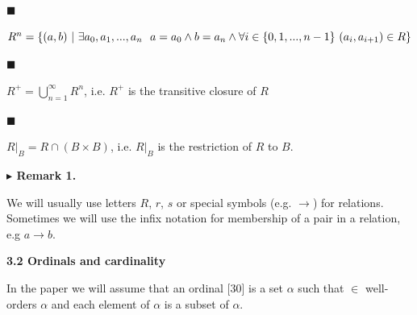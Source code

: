 \documentclass[10pt,a4paper]{amsart}
\begin{document}
 
 
\par\noindent  $\blacksquare$ 
 
$R^{n}=\{(a,b)\leavevmode\nobreak\ |\leavevmode\nobreak\ \exists a_{0},a_{1},..%
.,a_{n}\leavevmode\nobreak\ \leavevmode\nobreak\ a=a_{0}\wedge b=a_{n}\wedge%
\forall i\in\{0,1,...,n-1\}\leavevmode\nobreak\ (a_{i},a_{i+1})\in R\}$\par
 
 
 
\par\noindent  $\blacksquare$ 
 
$R^{+}=\bigcup_{n=1}^{\infty}R^{n}$, i.e. $R^{+}$ is the transitive closure of $R$\par
 
 
 
\par\noindent  $\blacksquare$ 
 
$R|_{B}=R\cap(B\times B)$, i.e. $R|_{B}$ is the restriction of $R$ to $B$.\par
 
 
  
 
 
\par\medskip\noindent\textbf{$\blacktriangleright$ Remark 1.}\par
 
 
We will usually use letters $R$, $r$, $s$ or special symbols (e.g. $\to$) for relations. Sometimes we will use the infix notation for membership of a pair in a relation, e.g $a\to b$.\par
 
 
 
 
 
\par\medskip\noindent\textbf{3.2 Ordinals and cardinality}\par
 
 
In the paper we will assume that an ordinal [30] is a set $\alpha$ such that $\in$ well-orders $\alpha$ and each element of $\alpha$ is a subset of $\alpha$.\par
 
\end{document}
